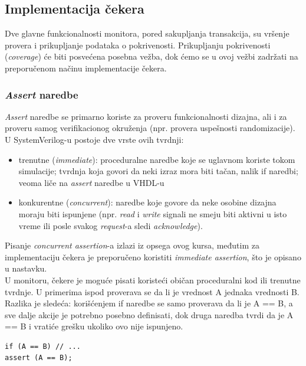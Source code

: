 
\subsection{Implementacija čekera}

Dve glavne funkcionalnosti monitora, pored sakupljanja transakcija, su vršenje
provera i prikupljanje podataka o pokrivenosti. Prikupljanju pokrivenosti
(\emph{coverage}) će biti posvećena posebna vežba, dok ćemo se u ovoj vežbi
zadržati na preporučenom načinu implementacije čekera.

\subsubsection{\emph{Assert} naredbe}

\emph{Assert} naredbe se primarno koriste za proveru funkcionalnosti dizajna,
ali i za proveru samog verifikacionog okruženja (npr. provera uspešnosti
randomizacije). U SystemVerilog-u postoje dve vrste ovih tvrdnji:

\begin{itemize}
\item trenutne (\emph{immediate}): proceduralne naredbe koje se uglavnom koriste
  tokom simulacije; tvrdnja koja govori da neki izraz mora biti tačan, nalik if
  naredbi; veoma liče na \emph{assert} naredbe u VHDL-u
\item konkurentne (\emph{concurrent}): naredbe koje govore da neke osobine
  dizajna moraju biti ispunjene (npr. \emph{read} i \emph{write} signali ne
  smeju biti aktivni u isto vreme ili posle svakog \emph{request}-a sledi
  \emph{acknowledge}).
\end{itemize}

Pisanje \emph{concurrent assertion}-a izlazi iz opsega ovog kursa, međutim za
implementaciju čekera je preporučeno koristiti \emph{immediate assertion}, što
je opisano u nastavku.\\

U monitoru, čekere je moguće pisati koristeći običan proceduralni kod ili
trenutne tvrdnje. U primerima ispod proverava se da li je vrednost A jednaka
vrednosti B. Razlika je sledeća: korišćenjem if naredbe se samo proverava da li
je A == B, a sve dalje akcije je potrebno posebno definisati, dok druga naredba
tvrdi da je A == B i vratiće grešku ukoliko ovo nije ispunjeno.

\begin{lstlisting}
if (A == B) // ...
assert (A == B);
\end{lstlisting}

